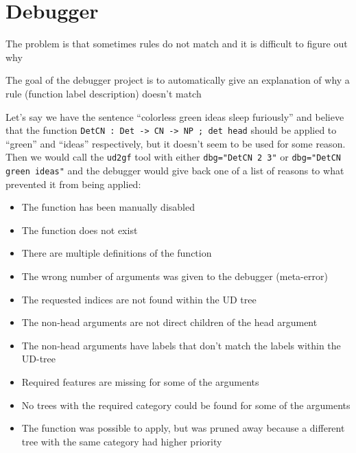 \chapter{Debugger}

The problem is that sometimes rules do not match and it is difficult to figure out why

The goal of the debugger project is to automatically give an explanation of why a rule (function label description) doesn't match




Let's say we have the sentence ``colorless green ideas sleep furiously'' and believe that the function \verb|DetCN : Det -> CN -> NP ; det head| should be applied to ``green'' and ``ideas'' respectively, but it doesn't seem to be
used for some reason. Then we would call the \texttt{ud2gf} tool with either \verb|dbg="DetCN 2 3"| or \verb|dbg="DetCN green ideas"| and the debugger would give back one of a list of reasons to what prevented it from being applied:

\begin{itemize}
    \item The function has been manually disabled
    \item The function does not exist
    \item There are multiple definitions of the function
    \item The wrong number of arguments was given to the debugger (meta-error)
    \item The requested indices are not found within the UD tree
    \item The non-head arguments are not direct children of the head argument
    \item The non-head arguments have labels that don't match the labels within the UD-tree
    \item Required features are missing for some of the arguments
    \item No trees with the required category could be found for some of the arguments
    \item The function was possible to apply, but was pruned away because a different tree with the same category had higher priority
\end{itemize}

